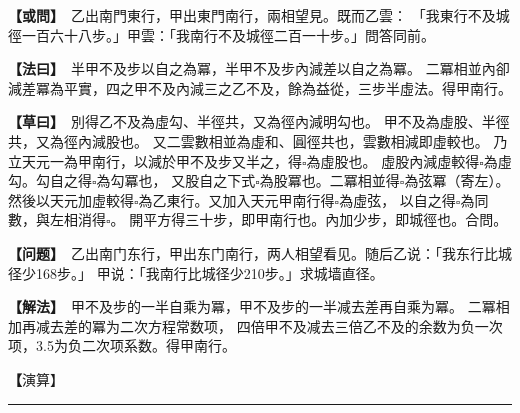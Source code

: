 \documentclass[11pt,a4paper]{article}
\let\origsquare\square
\renewcommand{\square}{\ensuremath{\origsquare}}%
\newcommand{\longline}{\noindent\rule{\textwidth}{0.4pt}}
\newcommand{\clOWEN}[1]{%
  \par\vspace{0.3em}%
  \noindent\textcolor{problemcolor}{\textbf{【或問】}}\,{\tradfont #1}\par\nopagebreak%
}
\newcommand{\mdOWEN}[1]{%
  \par\vspace{0.3em}%
  \noindent\textcolor{problemcolor}{\textbf{【问题】}}\,{\modfont #1}\par\nopagebreak%
}
\newcommand{\clFAYUE}[1]{%
  \par\noindent\textcolor{methodcolor}{\textbf{【法曰】}}\,{\tradfont #1}\par\nopagebreak%
}
\newcommand{\mdFAYUE}[1]{%
  \par\noindent\textcolor{methodcolor}{\textbf{【解法】}}\,{\modfont #1}\par\nopagebreak%
}
\newcommand{\clTSAOYUE}[1]{%
  \par\noindent\textcolor{workcolor}{\textbf{【草曰】}}\,{\tradfont #1}\par%
}
\newcommand{\mdTSAOYUE}[1]{%
  \par\noindent\textcolor{workcolor}{\textbf【演算】}}\,{\modfont #1}\par%
\begin{document}
\begin{paracol}{2}

\begin{leftcolumn}
\clOWEN{%
乙出南門東行，甲出東門南行，兩相望見。既而乙雲：
「我東行不及城徑一百六十八步。」甲雲：「我南行不及城徑二百一十步。」問答同前。}

\clFAYUE{%
半甲不及步以自之為冪，半甲不及步內減差以自之為冪。
二冪相並內卻減差冪為平實，四之甲不及內減三之乙不及，餘為益從，三步半虛法。得甲南行。}

\clTSAOYUE{%
別得乙不及為虛勾、半徑共，又為徑內減明勾也。
甲不及為虛股、半徑共，又為徑內減股也。
又二雲數相並為虛和、圓徑共也，雲數相減即虛較也。
乃立天元一為甲南行，以減於甲不及步又半之，得$\square$為虛股也。
虛股內減虛較得$\square$為虛勾。勾自之得$\square$為勾冪也，
又股自之下式$\square$為股冪也。二冪相並得$\square$為弦冪（寄左）。
然後以天元加虛較得$\square$為乙東行。又加入天元甲南行得$\square$為虛弦，
以自之得$\square$為同數，與左相消得$\square$。
開平方得三十步，即甲南行也。內加少步，即城徑也。合問。}
\end{leftcolumn}

\switchcolumn

\begin{rightcolumn}
\mdOWEN{%
乙出南门东行，甲出东门南行，两人相望看见。随后乙说：「我东行比城径少168步。」
甲说：「我南行比城径少210步。」求城墙直径。}

\mdFAYUE{%
甲不及步的一半自乘为冪，甲不及步的一半减去差再自乘为冪。
二冪相加再减去差的冪为二次方程常数项，
四倍甲不及减去三倍乙不及的余数为负一次项，3.5为负二次项系数。得甲南行。}

\mdTSAOYUE{%
辨识得：乙不及为虚勾与半半径之和，又为径减明勾。
甲不及为虚股与半半径之和，又为径减股。
二数相加为虚和与圆径之和，相减即虚较。
设天元一为甲南行，从甲不及步的一半中减去，得$\square$为虚股。
虚股减去虚较得$\square$为虚勾。勾自乘得$\square$为勾冪，
股自乘得$\square$为股冪。二冪相加得$\square$为弦冪（寄左）。
然后天元加虚较得$\square$为乙东行。再加天元（甲南行）得$\square$为虚弦，
自乘得$\square$为同数，与左式相消得$\square$。
开平方得30步，即甲南行。加上少步即城径。符合所问。}
\end{rightcolumn}

\end{paracol}

\vspace{0.3cm}
\begin{center}\longline\end{center}
\end{document}
